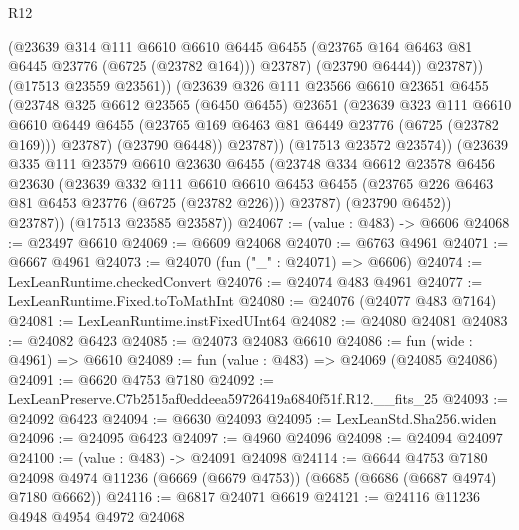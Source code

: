 \begin{lexlean}{R12}
\begin{coremodule}
                    (@23639
                      @314
                      @111
                      @6610
                      @6610
                      @6445
                      @6455
                      (@23765 @164 @6463 @81 @6445 @23776 (@6725 (@23782 @164)))
                      @23787)
                    (@23790 @6444))
                  @23787))
              (@17513 @23559 @23561))
            (@23639
              @326
              @111
              @23566
              @6610
              @23651
              @6455
              (@23748
                @325
                @6612
                @23565
                (@6450 @6455)
                @23651
                (@23639
                  @323
                  @111
                  @6610
                  @6610
                  @6449
                  @6455
                  (@23765 @169 @6463 @81 @6449 @23776 (@6725 (@23782 @169)))
                  @23787)
                (@23790 @6448))
              @23787))
          (@17513 @23572 @23574))
        (@23639
          @335
          @111
          @23579
          @6610
          @23630
          @6455
          (@23748
            @334
            @6612
            @23578
            @6456
            @23630
            (@23639
              @332
              @111
              @6610
              @6610
              @6453
              @6455
              (@23765 @226 @6463 @81 @6453 @23776 (@6725 (@23782 @226)))
              @23787)
            (@23790 @6452))
          @23787))
      (@17513 @23585 @23587))
@24067 := (value : @483) -> @6606
@24068 := @23497 @6610
@24069 := @6609 @24068
@24070 := @6763 @4961
@24071 := @6667 @4961
@24073 := @24070 (fun ("_" : @24071) => @6606)
@24074 := LexLeanRuntime.checkedConvert
@24076 := @24074 @483 @4961
@24077 := LexLeanRuntime.Fixed.toToMathInt
@24080 := @24076 (@24077 @483 @7164)
@24081 := LexLeanRuntime.instFixedUInt64
@24082 := @24080 @24081
@24083 := @24082 @6423
@24085 := @24073 @24083 @6610
@24086 := fun (wide : @4961) => @6610
@24089 := fun (value : @483) => @24069 (@24085 @24086)
@24091 := @6620 @4753 @7180
@24092 := LexLeanPreserve.C7b2515af0eddeea59726419a6840f51f.R12.__fits_25
@24093 := @24092 @6423
@24094 := @6630 @24093
@24095 := LexLeanStd.Sha256.widen
@24096 := @24095 @6423
@24097 := @4960 @24096
@24098 := @24094 @24097
@24100 := (value : @483) -> @24091 @24098
@24114 := @6644
    @4753
    @7180
    @24098
    @4974
    @11236
    (@6669 (@6679 @4753))
    (@6685 (@6686 (@6687 @4974) @7180 @6662))
@24116 := @6817 @24071 @6619
@24121 := @24116 @11236 @4948 @4954 @4972 @24068

\end{coremodule}
\end{lexlean}
